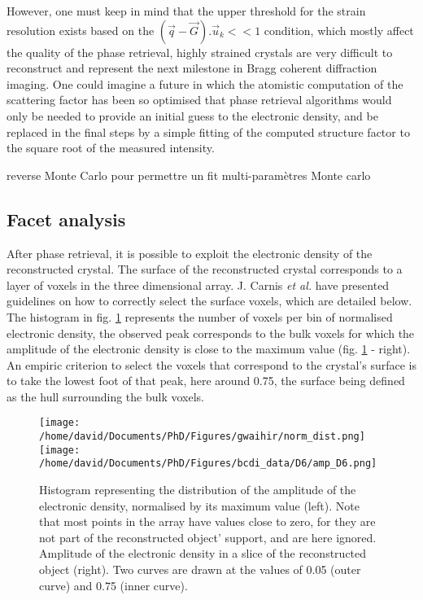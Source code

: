 However, one must keep in mind that the upper threshold for the strain resolution exists based on the $(\vec{q}-\vec{G}).\vec{u}_k<<1$ condition, which mostly affect the quality of the phase retrieval, highly strained crystals are very difficult to reconstruct and represent the next milestone in Bragg coherent diffraction imaging.
One could imagine a future in which the atomistic computation of the scattering factor has been so optimised that phase retrieval algorithms would only be needed to provide an initial guess to the electronic density, and be replaced in the final steps by a simple fitting of the computed structure factor to the square root of the measured intensity.

\textcolor{Important}{reverse Monte Carlo pour permettre un fit multi-paramètres
 Monte carlo \parencite{RLMcGreevy_2001}}

\subsection{Facet analysis} \label{sec:FacetAnalysis}

After phase retrieval, it is possible to exploit the electronic density of the reconstructed crystal.
The surface of the reconstructed crystal corresponds to a layer of voxels in the three dimensional array.
J. Carnis \textit{et al.} \parencite*{Carnis2019_scientific_reports} have presented guidelines on how to correctly select the surface voxels, which are detailed below.
The histogram in fig. \ref{fig:histo} represents the number of voxels per bin of normalised electronic density, the observed peak corresponds to the bulk voxels for which the amplitude of the electronic density is close to the maximum value (fig. \ref{fig:histo} - right).
An empiric criterion to select the voxels that correspond to the crystal's surface is to take the lowest foot of that peak, here around \num{0.75}, the surface being defined as the hull surrounding the bulk voxels.

\begin{figure}[!htb]
   \centering
   \texttt{[image: /home/david/Documents/PhD/Figures/gwaihir/norm\_dist.png]}
   \texttt{[image: /home/david/Documents/PhD/Figures/bcdi\_data/D6/amp\_D6.png]}
   \caption{
   Histogram representing the distribution of the amplitude of the electronic density, normalised by its maximum value (left).
   Note that most points in the array have values close to zero, for they are not part of the reconstructed object' support, and are here ignored.
   Amplitude of the electronic density in a slice of the reconstructed object (right).
   Two curves are drawn at the values of \num{0.05} (outer curve) and \num{0.75} (inner curve).
   }
   \label{fig:histo}
\end{figure}

